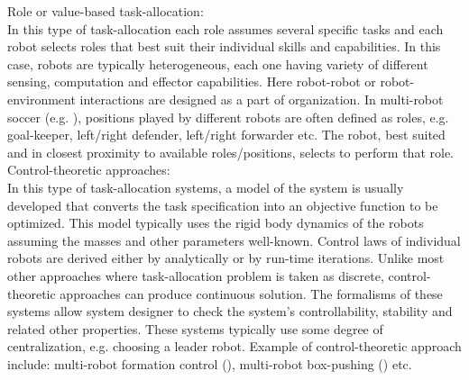 Role or value-based task-allocation:\\
In this type of task-allocation each role assumes several specific tasks and each robot selects roles that best suit their individual skills and capabilities. In this case, robots are typically heterogeneous, each one having variety of different sensing, computation and effector capabilities. Here robot-robot or robot-environment interactions are designed as a part of organization. In multi-robot soccer (e.g. \cite{Stone+1999}), positions played by different  robots are often defined as roles, e.g. goal-keeper, left/right defender, left/right forwarder etc. The robot, best suited and in closest proximity to available roles/positions, selects to perform that role.\\

Control-theoretic approaches:\\
In this type of task-allocation systems, a model of the system is usually developed that converts the task specification into an objective function to be optimized. This model typically  uses  the rigid  body dynamics of the robots assuming the masses and other parameters well-known. Control laws of individual robots are derived either by analytically or by run-time iterations. Unlike most other approaches where task-allocation problem is taken as discrete, control-theoretic approaches can produce continuous  solution. The formalisms of these systems allow system designer to check the system's controllability, stability and related other properties.  These systems typically use some degree of centralization, e.g. choosing a leader robot.  Example of control-theoretic approach include: multi-robot formation control (\cite{Belta+2004}), multi-robot box-pushing (\cite{Pereira+2003 })  etc.

